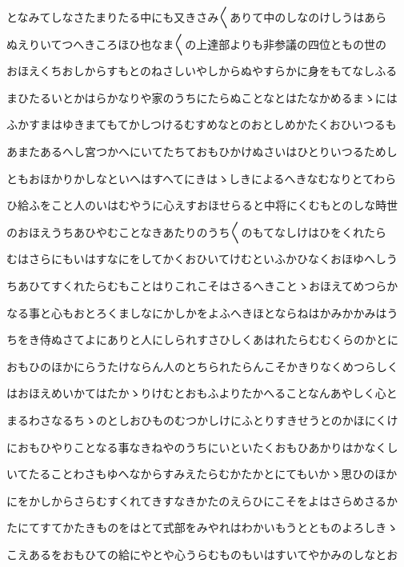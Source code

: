 \documentclass[a4paper,11pt,landscape]{ltjtarticle}
\begin{document}
\par\medskip
となみてしなさたまりたる中にも又きさみ〱ありて中のしなのけしうはあら
\par\medskip
ぬえりいてつへきころほひ也なま〱の上達部よりも非参議の四位ともの世の
\par\medskip
おほえくちおしからすもとのねさしいやしからぬやすらかに身をもてなしふる
\par\medskip
まひたるいとかはらかなりや家のうちにたらぬことなとはたなかめるまゝには
\par\medskip
ふかすまはゆきまてもてかしつけるむすめなとのおとしめかたくおひいつるも
\par\medskip
あまたあるへし宮つかへにいてたちておもひかけぬさいはひとりいつるためし
\par\medskip
ともおほかりかしなといへはすへてにきはゝしきによるへきなむなりとてわら
\par\medskip
ひ給ふをこと人のいはむやうに心えすおほせらると中将にくむもとのしな時世
\par\medskip
のおほえうちあひやむことなきあたりのうち〱のもてなしけはひをくれたら
\par\medskip
むはさらにもいはすなにをしてかくおひいてけむといふかひなくおほゆへしう
\par\medskip
ちあひてすくれたらむもことはりこれこそはさるへきことゝおほえてめつらか
\par\medskip
なる事と心もおとろくましなにかしかをよふへきほとならねはかみかかみはう
\par\medskip
ちをき侍ぬさてよにありと人にしられすさひしくあはれたらむむくらのかとに
\par\medskip
おもひのほかにらうたけならん人のとちられたらんこそかきりなくめつらしく
\par\medskip
はおほえめいかてはたかゝりけむとおもふよりたかへることなんあやしく心と
\par\medskip
まるわさなるちゝのとしおひものむつかしけにふとりすきせうとのかほにくけ
\par\medskip
におもひやりことなる事なきねやのうちにいといたくおもひあかりはかなくし
\par\medskip
いてたることわさもゆへなからすみえたらむかたかとにてもいかゝ思ひのほか
\par\medskip
にをかしからさらむすくれてきすなきかたのえらひにこそをよはさらめさるか
\par\medskip
たにてすてかたきものをはとて式部をみやれはわかいもうととものよろしきゝ
\par\medskip
こえあるをおもひての給にやとや心うらむものもいはすいてやかみのしなとお
\par\medskip
\end{document}
